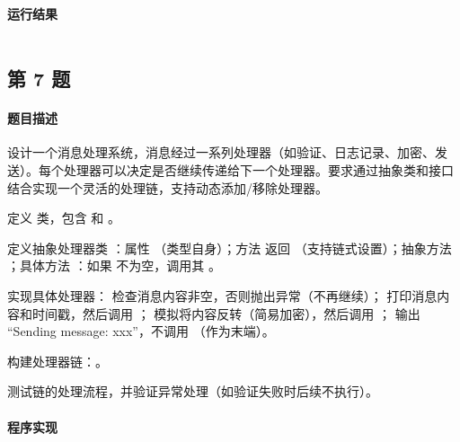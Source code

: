 \documentclass{academics}
\begin{document}
\paragraph{运行结果} {
    \inputminted{text}{../res/P06.out}
}

\subsection{第 7 题}

\paragraph{题目描述} {
    设计一个消息处理系统，消息经过一系列处理器（如验证、日志记录、加密、发送）。每个处理器可以决定是否继续传递给下一个处理器。要求通过抽象类和接口结合实现一个灵活的处理链，支持动态添加/移除处理器。

    定义  类，包含  和 。

    定义抽象处理器类 ：属性 （类型自身）；方法  返回 （支持链式设置）；抽象方法 ；具体方法 ：如果  不为空，调用其 。

    实现具体处理器： 检查消息内容非空，否则抛出异常（不再继续）； 打印消息内容和时间戳，然后调用 ； 模拟将内容反转（简易加密），然后调用 ； 输出 ``Sending message: xxx''，不调用 （作为末端）。

    构建处理器链：。

    测试链的处理流程，并验证异常处理（如验证失败时后续不执行）。
}

\paragraph{程序实现} {
    \inputminted[label=Message.java]{java}{../src/P07/Message.java}
    \inputminted[label=MessageHandler.java]{java}{../src/P07/MessageHandler.java}
    \inputminted[label=ValidationHandler.java]{java}{../src/P07/ValidationHandler.java}
    \inputminted[label=LoggingHandler.java]{java}{../src/P07/LoggingHandler.java}
    \inputminted[label=EncryptionHandler.java]{java}{../src/P07/EncryptionHandler.java}
    \inputminted[label=SendingHandler.java]{java}{../src/P07/SendingHandler.java}
    \inputminted[label=MessageChainTest.java]{java}{../src/P07/MessageChainTest.java}
}
\end{document}
